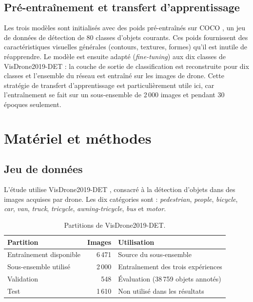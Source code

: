 \documentclass[11pt,a4paper]{article}
\begin{document}
\subsection{Pré-entraînement et transfert d'apprentissage}
Les trois modèles sont initialisés avec des poids pré-entraînés sur COCO
\citep{lin2014coco}, un jeu de données de détection de 80 classes d'objets
courants. Ces poids fournissent des caractéristiques visuelles générales
(contours, textures, formes) qu'il est inutile de réapprendre. Le modèle est
ensuite adapté (\emph{fine-tuning}) aux dix classes de VisDrone2019-DET :
la couche de sortie de classification est reconstruite pour dix classes et
l'ensemble du réseau est entraîné sur les images de drone. Cette stratégie
de transfert d'apprentissage est particulièrement utile ici, car
l'entraînement se fait sur un sous-ensemble de 2\,000 images et pendant 30
époques seulement.




\section{Matériel et méthodes}
\label{sec:methodes}

\subsection{Jeu de données}
L'étude utilise VisDrone2019-DET \citep{zhu2020visdrone,du2019visdrone},
consacré à la détection d'objets dans des images acquises par drone. Les dix
catégories sont : \emph{pedestrian}, \emph{people}, \emph{bicycle},
\emph{car}, \emph{van}, \emph{truck}, \emph{tricycle},
\emph{awning-tricycle}, \emph{bus} et \emph{motor}.

\begin{table}[htbp]
\centering
\small
\begin{tabular}{@{}lrl@{}}
\toprule
Partition & Images & Utilisation \\
\midrule
Entraînement disponible & 6\,471 & Source du sous-ensemble \\
Sous-ensemble utilisé & 2\,000 & Entraînement des trois expériences \\
Validation & 548 & Évaluation (38\,759 objets annotés) \\
Test & 1\,610 & Non utilisé dans les résultats \\
\bottomrule
\end{tabular}
\caption{Partitions de VisDrone2019-DET.}
\label{tab:donnees}
\end{table}
\end{document}
